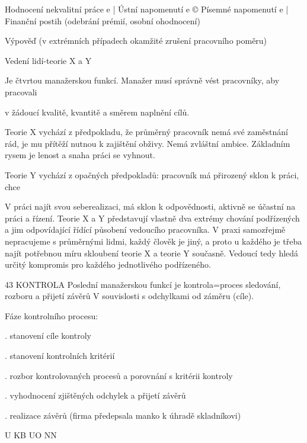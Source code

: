 Hodnocení nekvalitní práce
e | Ústní napomenutí
e © Písemné napomenutí
e | Finanční postih (odebrání prémií, osobní ohodnocení)

Výpověď (v extrémních případech okamžité zrušení pracovního poměru)

Vedení lidí-teorie X a Y

Je čtvrtou manažerskou funkcí. Manažer musí správně vést pracovníky, aby pracovali

v žádoucí kvalitě, kvantitě a směrem naplnění cílů.

Teorie X vychází z předpokladu, že průměrný pracovník nemá své zaměstnání rád, je mu
přítěží nutnou k zajištění obživy. Nemá zvláštní ambice. Základním rysem je lenost a snaha
práci se vyhnout.

Teorie Y vychází z opačných předpokladů: pracovník má přirozený sklon k práci, chce

V práci najít svou seberealizaci, má sklon k odpovědnosti, aktivně se účastní na práci a řízení.
Teorie X a Y představují vlastně dva extrémy chování podřízených a jim odpovídající řídící
působení vedoucího pracovníka. V praxi samozřejmě nepracujeme s průměrnými lidmi, každý
člověk je jiný, a proto u každého je třeba najít potřebnou míru skloubení teorie X a teorie Y
současně. Vedoucí tedy hledá určitý kompromis pro každého jednotlivého podřízeného.

43
\newpage
KONTROLA
Poslední manažerskou funkcí je kontrola=proces sledování, rozboru a přijetí závěrů
V souvislosti s odchylkami od záměru (cíle).

Fáze kontrolního procesu:

. stanovení cíle kontroly

. stanovení kontrolních kritérií

. rozbor kontrolovaných procesů a porovnání s kritérii kontroly

. vyhodnocení zjištěných odchylek a přijetí závěrů

. realizace závěrů (firma předepsala manko k úhradě skladníkovi)

U KB UO NN